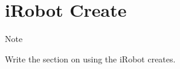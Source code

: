 \hypertarget{irobot-create}{%
\section{iRobot Create}\label{irobot-create}}

Note

Write the section on using the iRobot creates.
